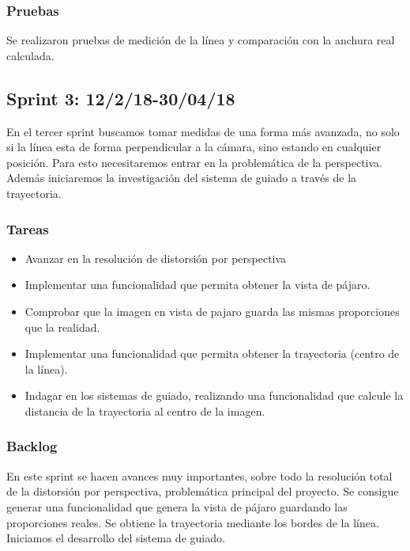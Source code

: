 \subsubsection{Pruebas}
Se realizaron pruebas de medición de la línea y comparación con la anchura real calculada.


\subsection{Sprint 3: 12/2/18-30/04/18}

En el tercer sprint buscamos tomar medidas de una forma más avanzada, no solo si la línea esta de forma perpendicular a la cámara, sino estando en cualquier posición. Para esto necesitaremos entrar en la problemática de la perspectiva. Además iniciaremos la investigación del sistema de guiado a través de la trayectoria.
\subsubsection{Tareas}
\begin{itemize}

	\item Avanzar en la resolución de distorsión por perspectiva
	
	\item Implementar una funcionalidad que permita obtener la vista de pájaro.
	
	\item Comprobar que la imagen en vista de pajaro guarda las mismas proporciones que la realidad.
	
	\item Implementar una funcionalidad que permita obtener la trayectoria (centro de la línea).
	
	\item Indagar en los sistemas de guiado, realizando una funcionalidad que calcule la distancia de la trayectoria al centro de la imagen.

\end{itemize}
\subsubsection{Backlog}
En este sprint se hacen avances muy importantes, sobre todo la resolución total de la distorsión por perspectiva, problemática principal del proyecto. Se consigue generar una funcionalidad que genera la vista de pájaro guardando las proporciones reales. Se obtiene la trayectoria mediante los bordes de la línea. Iniciamos el desarrollo del sistema de guiado.
